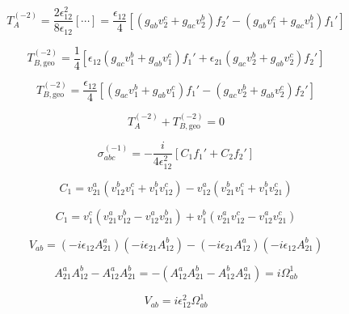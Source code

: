 \documentclass{article}
\begin{document}
\begin{equation}
\label{eq:D-61}
T_{A}^{(-2)}=\frac{2\epsilon_{12}^{2}}{8\epsilon_{12}}[\cdots]=\frac{\epsilon_{12}}{4}[(g_{ab}v_{2}^{c}+g_{ac}v_{2}^{b})f_{2}'-(g_{ab}v_{1}^{c}+g_{ac}v_{1}^{b})f_{1}']
\end{equation}

\begin{equation}
\label{eq:D-66}
T_{B,\mathrm{geo}}^{(-2)}=\frac{1}{4}[\epsilon_{12}(g_{ac}v_{1}^{b}+g_{ab}v_{1}^{c})f_{1}'+\epsilon_{21}(g_{ac}v_{2}^{b}+g_{ab}v_{2}^{c})f_{2}']
\end{equation}

\begin{equation}
\label{eq:D-67}
T_{B,\mathrm{geo}}^{(-2)}=\frac{\epsilon_{12}}{4}[(g_{ac}v_{1}^{b}+g_{ab}v_{1}^{c})f_{1}'-(g_{ac}v_{2}^{b}+g_{ab}v_{2}^{c})f_{2}']
\end{equation}

\begin{equation}
\label{eq:D-68}
T_{A}^{(-2)}+T_{B,\mathrm{geo}}^{(-2)}=0
\end{equation}

\begin{equation}
\label{eq:D-70}
\sigma_{abc}^{(-1)}=-\frac{i}{4\epsilon_{12}^{2}}[C_{1}f_{1}'+C_{2}f_{2}']
\end{equation}

\begin{equation}
\label{eq:D-71}
C_{1}=v_{21}^{a}(v_{12}^{b}v_{1}^{c}+v_{1}^{b}v_{12}^{c})-v_{12}^{a}(v_{21}^{b}v_{1}^{c}+v_{1}^{b}v_{21}^{c})
\end{equation}

\begin{equation}
\label{eq:D-72}
C_{1}=v_{1}^{c}(v_{21}^{a}v_{12}^{b}-v_{12}^{a}v_{21}^{b})+v_{1}^{b}(v_{21}^{a}v_{12}^{c}-v_{12}^{a}v_{21}^{c})
\end{equation}

\begin{equation}
\label{eq:D-73}
V_{ab}=(-i\epsilon_{12}A_{21}^{a})(-i\epsilon_{21}A_{12}^{b})-(-i\epsilon_{21}A_{12}^{a})(-i\epsilon_{12}A_{21}^{b})
\end{equation}

\begin{equation}
\label{eq:D-74}
A_{21}^{a}A_{12}^{b}-A_{12}^{a}A_{21}^{b}=-(A_{12}^{a}A_{21}^{b}-A_{12}^{b}A_{21}^{a})=i\Omega_{ab}^{1}
\end{equation}

\begin{equation}
\label{eq:D-75}
V_{ab}=i\epsilon_{12}^{2}\Omega_{ab}^{1}
\end{equation}
\end{document}
